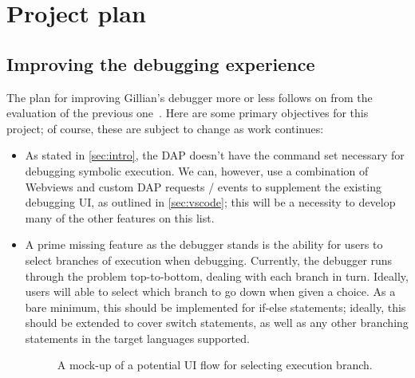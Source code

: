 
\chapter{Project plan}
\label{cha:plan}

\section{Improving the debugging experience}

The plan for improving Gillian's debugger more or less follows on from the
evaluation of the previous one~\cite{gillian-debugging-2021}. Here are some
primary objectives for this project; of course, these are subject to change as
work continues:

\begin{itemize}

  \item As stated in \autoref{sec:intro}, the DAP doesn't have the command set
        necessary for debugging symbolic execution. We can, however, use a
        combination of Webviews and custom DAP requests / events to supplement
        the existing debugging UI, as outlined in \autoref{sec:vscode}; this
        will be a necessity to develop many of the other features on this list.

  \item A prime missing feature as the debugger stands is the ability for users
        to select branches of execution when debugging. Currently, the debugger
        runs through the problem top-to-bottom, dealing with each branch in
        turn. Ideally, users will able to select which branch to go down when
        given a choice. As a bare minimum, this should be implemented for
        if-else statements; ideally, this should be extended to cover switch
        statements, as well as any other branching statements in the target
        languages supported.

\begin{figure}
  \noindent
  \caption{A mock-up of a potential UI flow for selecting execution branch.}
  \label{fig:branch-selection-mockup}
\end{figure}


\end{itemize}
